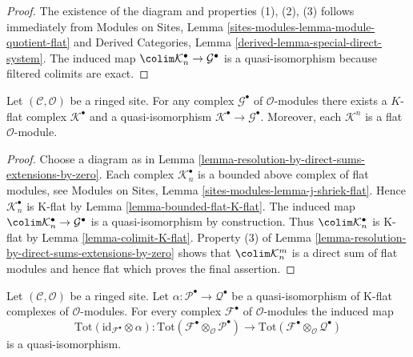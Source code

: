 \begin{proof}
The existence of the diagram and properties (1), (2), (3) follows immediately
from
Modules on Sites, Lemma \ref{sites-modules-lemma-module-quotient-flat}
and
Derived Categories, Lemma \ref{derived-lemma-special-direct-system}.
The induced map
$\colim \mathcal{K}_n^\bullet \to \mathcal{G}^\bullet$
is a quasi-isomorphism because filtered colimits are exact.
\end{proof}

\begin{lemma}
\label{lemma-K-flat-resolution}
Let $(\mathcal{C}, \mathcal{O})$ be a ringed site.
For any complex $\mathcal{G}^\bullet$ of $\mathcal{O}$-modules
there exists a $K$-flat complex
$\mathcal{K}^\bullet$ and a quasi-isomorphism
$\mathcal{K}^\bullet \to \mathcal{G}^\bullet$.
Moreover, each $\mathcal{K}^n$ is a flat $\mathcal{O}$-module.
\end{lemma}

\begin{proof}
Choose a diagram as in
Lemma \ref{lemma-resolution-by-direct-sums-extensions-by-zero}.
Each complex $\mathcal{K}_n^\bullet$ is a bounded
above complex of flat modules, see
Modules on Sites, Lemma \ref{sites-modules-lemma-j-shriek-flat}.
Hence $\mathcal{K}_n^\bullet$ is K-flat by
Lemma \ref{lemma-bounded-flat-K-flat}.
The induced map
$\colim \mathcal{K}_n^\bullet \to \mathcal{G}^\bullet$
is a quasi-isomorphism by construction. Thus
$\colim \mathcal{K}_n^\bullet$ is K-flat by
Lemma \ref{lemma-colimit-K-flat}. Property (3)
of Lemma \ref{lemma-resolution-by-direct-sums-extensions-by-zero}
shows that $\colim \mathcal{K}_n^m$ is a direct sum of
flat modules and hence flat which proves the final assertion.
\end{proof}

\begin{lemma}
\label{lemma-derived-tor-quasi-isomorphism-other-side}
Let $(\mathcal{C}, \mathcal{O})$ be a ringed site. Let
$\alpha : \mathcal{P}^\bullet \to \mathcal{Q}^\bullet$ be a
quasi-isomorphism of K-flat complexes of $\mathcal{O}$-modules.
For every complex $\mathcal{F}^\bullet$ of $\mathcal{O}$-modules
the induced map
$$
\text{Tot}(\text{id}_{\mathcal{F}^\bullet} \otimes \alpha) :
\text{Tot}(\mathcal{F}^\bullet \otimes_\mathcal{O} \mathcal{P}^\bullet)
\longrightarrow
\text{Tot}(\mathcal{F}^\bullet \otimes_\mathcal{O} \mathcal{Q}^\bullet)
$$
is a quasi-isomorphism.
\end{lemma}

